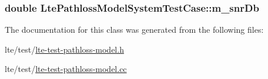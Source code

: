 \subsubsection[{\texorpdfstring{m\+\_\+snr\+Db}{m_snrDb}}]{\setlength{\rightskip}{0pt plus 5cm}double Lte\+Pathloss\+Model\+System\+Test\+Case\+::m\+\_\+snr\+Db\hspace{0.3cm}{\ttfamily [private]}}\hypertarget{classLtePathlossModelSystemTestCase_a35c21405e185bd4b200a8d2d14f683b3}{}\label{classLtePathlossModelSystemTestCase_a35c21405e185bd4b200a8d2d14f683b3}


The documentation for this class was generated from the following files\+:\begin{DoxyCompactItemize}
\item 
lte/test/\hyperlink{lte-test-pathloss-model_8h}{lte-\/test-\/pathloss-\/model.\+h}\item 
lte/test/\hyperlink{lte-test-pathloss-model_8cc}{lte-\/test-\/pathloss-\/model.\+cc}\end{DoxyCompactItemize}
